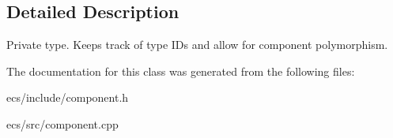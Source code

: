 \subsection{Detailed Description}
Private type. Keeps track of type I\-Ds and allow for component polymorphism. 

The documentation for this class was generated from the following files\-:\begin{DoxyCompactItemize}
\item 
ecs/include/component.\-h\item 
ecs/src/component.\-cpp\end{DoxyCompactItemize}
